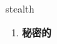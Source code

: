 
\begin{frame}
{\huge stealth}
\begin{center}
\begin{enumerate}\Large
  \item \textbf{秘密的}
\end{enumerate}
\end{center}
\end{frame}
